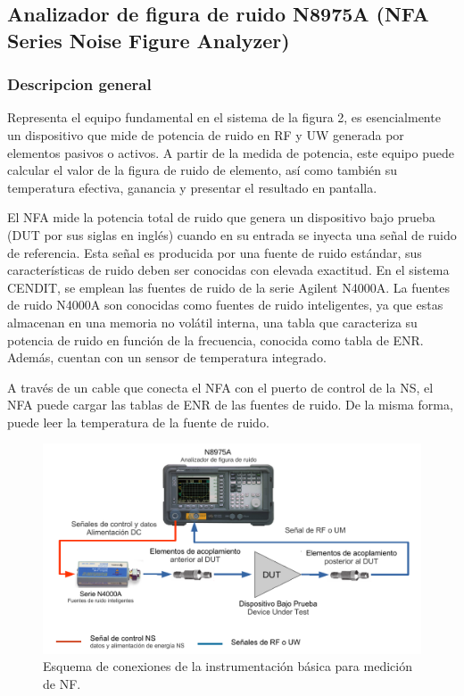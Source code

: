 \subsection{Analizador de figura de ruido N8975A (NFA Series Noise Figure Analyzer)}
\subsubsection{Descripcion general}

Representa el equipo fundamental en el sistema de la figura 2, es esencialmente un dispositivo que mide de potencia de ruido en RF y UW generada por elementos pasivos o activos. A partir de la medida de potencia, este equipo puede	calcular el valor de la figura de ruido de elemento, así como también su temperatura efectiva, ganancia y presentar el resultado en pantalla. 

El NFA mide la potencia total de ruido que genera un dispositivo bajo prueba (DUT por sus siglas en inglés) cuando en su entrada se inyecta una señal de ruido de referencia. Esta señal es producida por una fuente de ruido estándar, sus características de ruido deben ser conocidas con elevada exactitud. En el sistema CENDIT, se emplean las fuentes de ruido de la serie Agilent N4000A. La fuentes de ruido N4000A son conocidas como fuentes de ruido inteligentes, ya que	estas almacenan en una memoria no volátil interna, una tabla que caracteriza su potencia de ruido en función de la frecuencia, conocida como tabla de ENR. Además, cuentan con un sensor de temperatura integrado.

A través de un cable que conecta el NFA con el puerto de control de la NS, el NFA puede cargar las tablas de ENR de las fuentes de ruido. De la misma forma, puede leer la temperatura de la fuente de ruido.

\begin{figure}[h!]
	\centering
	\includegraphics[width=15cm]{./Imagenes/EsquemaConexionNFADUT.pdf}
	\caption{Esquema de conexiones de la instrumentación básica para medición de NF.}
\label{Fig:BancoPruebasFuenteRuido}
\end{figure}

